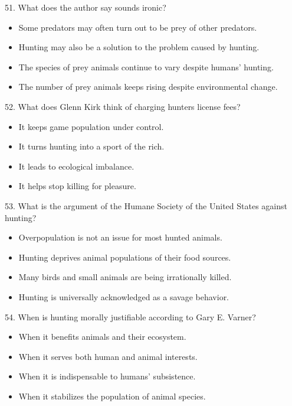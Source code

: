 \documentclass[UTF8,11pt]{ctexart}
\begin{document}
51. What does the author say sounds ironic?


\begin{itemize}[leftmargin=2em,itemsep=.2em,topsep=.4em]\item[A.] Some predators may often turn out to be prey of other predators.
\item[B.] Hunting may also be a solution to the problem caused by hunting.
\item[C.] The species of prey animals continue to vary despite humans’ hunting.
\item[D.] The number of prey animals keeps rising despite environmental change.
\end{itemize}

52. What does Glenn Kirk think of charging hunters license fees?


\begin{itemize}[leftmargin=2em,itemsep=.2em,topsep=.4em]\item[A.] It keeps game population under control.
\item[B.] It turns hunting into a sport of the rich.
\item[C.] It leads to ecological imbalance.
\item[D.] It helps stop killing for pleasure.
\end{itemize}

53. What is the argument of the Humane Society of the United States against hunting?


\begin{itemize}[leftmargin=2em,itemsep=.2em,topsep=.4em]\item[A.] Overpopulation is not an issue for most hunted animals.
\item[B.] Hunting deprives animal populations of their food sources.
\item[C.] Many birds and small animals are being irrationally killed.
\item[D.] Hunting is universally acknowledged as a savage behavior.
\end{itemize}

54. When is hunting morally justifiable according to Gary E. Varner?


\begin{itemize}[leftmargin=2em,itemsep=.2em,topsep=.4em]\item[A.] When it benefits animals and their ecosystem.
\item[B.] When it serves both human and animal interests.
\item[C.] When it is indispensable to humans’ subsistence.
\item[D.] When it stabilizes the population of animal species.
\end{itemize}
\end{document}
